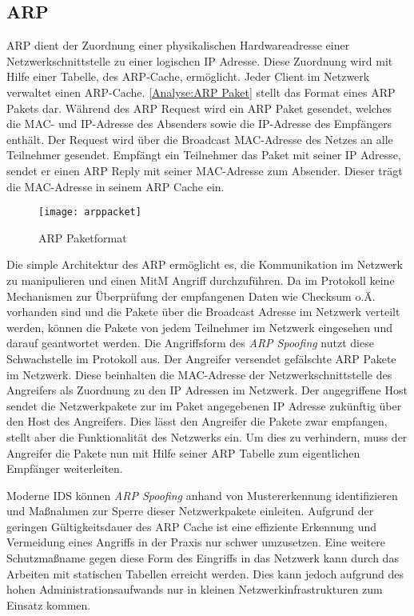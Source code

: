 \subsection{\ac{ARP}}
\label{Analyse:ARP}
\ac{ARP} dient der Zuordnung einer physikalischen Hardwareadresse einer Netzwerkschnittstelle zu einer logischen \ac{IP} Adresse. Diese Zuordnung wird mit Hilfe einer Tabelle, des \ac{ARP}-Cache, ermöglicht. Jeder Client im Netzwerk verwaltet einen \ac{ARP}-Cache. \autoref{Analyse:ARP Paket} stellt das Format eines \ac{ARP} Pakets dar. Während des \ac{ARP} Request wird ein \ac{ARP} Paket gesendet, welches die MAC- und \ac{IP}-Adresse des Absenders sowie die \ac{IP}-Adresse des Empfängers enthält. Der Request wird über die Broadcast MAC-Adresse des Netzes an alle Teilnehmer gesendet. Empfängt ein Teilnehmer das Paket mit seiner \ac{IP} Adresse, sendet er einen \ac{ARP} Reply mit seiner MAC-Adresse zum Absender. Dieser trägt die MAC-Adresse in seinem \ac{ARP} Cache ein.

\begin{figure}[h]
  \centering
  \texttt{[image: arppacket]}
  \caption{ARP Paketformat}
  \label{Analyse:ARP Paket}
\end{figure}

Die simple Architektur des \ac{ARP} ermöglicht es, die Kommunikation im Netzwerk zu manipulieren und einen \ac{MitM} Angriff durchzuführen. Da im Protokoll keine Mechanismen zur Überprüfung der empfangenen Daten wie Checksum o.Ä. vorhanden sind und die Pakete über die Broadcast Adresse im Netzwerk verteilt werden, können die Pakete von jedem Teilnehmer im Netzwerk eingesehen und darauf geantwortet werden. Die Angriffsform des \textit{\ac{ARP} Spoofing} nutzt diese Schwachstelle im Protokoll aus. Der Angreifer versendet gefälschte \ac{ARP} Pakete im Netzwerk. Diese beinhalten die MAC-Adresse der Netzwerkschnittstelle des Angreifers als Zuordnung zu den \ac{IP} Adressen im Netzwerk. Der angegriffene Host sendet die Netzwerkpakete zur im Paket angegebenen \ac{IP} Adresse zukünftig über den Host des Angreifers. Dies lässt den Angreifer die Pakete zwar empfangen, stellt aber die Funktionalität des Netzwerks ein. Um dies zu verhindern, muss der Angreifer die Pakete nun mit Hilfe seiner \ac{ARP} Tabelle zum eigentlichen Empfänger weiterleiten.

Moderne \ac{IDS} können \textit{\ac{ARP} Spoofing} anhand von Mustererkennung identifizieren und Maßnahmen zur Sperre dieser Netzwerkpakete einleiten. Aufgrund der geringen Gültigkeitsdauer des \ac{ARP} Cache ist eine effiziente Erkennung und Vermeidung eines Angriffs in der Praxis nur schwer umzusetzen. Eine weitere Schutzmaßname gegen diese Form des Eingriffs in das Netzwerk kann durch das Arbeiten mit statischen Tabellen erreicht werden. Dies kann jedoch aufgrund des hohen Administrationsaufwands nur in kleinen Netzwerkinfrastrukturen zum Einsatz kommen.

